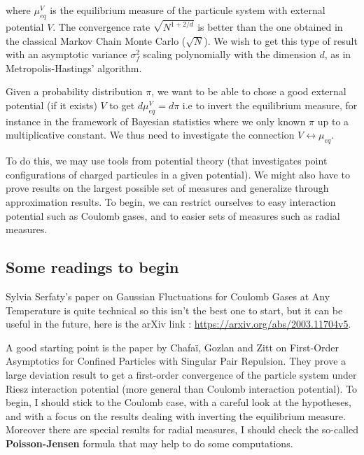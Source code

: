 \documentclass[a4paper,12pt]{report}
\begin{document}
where $\mu_{eq}^{V}$ is the equilibrium measure of the particule system with external potential $V$. The convergence rate $\sqrt{N^{1+2/d}}$ is better than the one obtained in the classical Markov Chain Monte Carlo ($\sqrt{N}$). We wish to get this type of result with an asymptotic variance $\sigma_{f}^{2}$ scaling polynomially with the dimension $d$, as in Metropolis-Hastings' algorithm.

Given a probability distribution $\pi$, we want to be able to chose a good external potential (if it exists) $V$ to get $d\mu_{eq}^{V} = d\pi$ i.e to invert the equilibrium measure, for instance in the framework of Bayesian statistics where we only known $\pi$ up to a multiplicative constant. We thus need to investigate the connection $V \leftrightarrow \mu_{eq}$.

To do this, we may use tools from potential theory (that investigates point configurations of charged particules in a given potential). We might also have to prove results on the largest possible set of measures and generalize through approximation results. To begin, we can restrict ourselves to easy interaction potential such as Coulomb gases, and to easier sets of measures such as radial measures.

\subsection*{Some readings to begin}

Sylvia Serfaty's paper \cite{serfaty2020} on Gaussian Fluctuations for Coulomb Gases at Any Temperature is quite technical so this isn't the best one to start, but it can be useful in the future, here is the arXiv link : \href{https://arxiv.org/abs/2003.11704v5}{https://arxiv.org/abs/2003.11704v5}.
\vspace{0.5cm}

A good starting point is the paper by Chafaï, Gozlan and Zitt \cite{chafai-gozlan-zitt} on First-Order Asymptotics for Confined Particles with Singular Pair Repulsion. They prove a large deviation result to get a first-order convergence of the particle system under Riesz interaction potential (more general than Coulomb interaction potential). To begin, I should stick to the Coulomb case, with a careful look at the hypotheses, and with a focus on the results dealing with inverting the equilibrium measure. Moreover there are special results for radial measures, I should check the so-called \textbf{Poisson-Jensen} formula that may help to do some computations.
\end{document}
